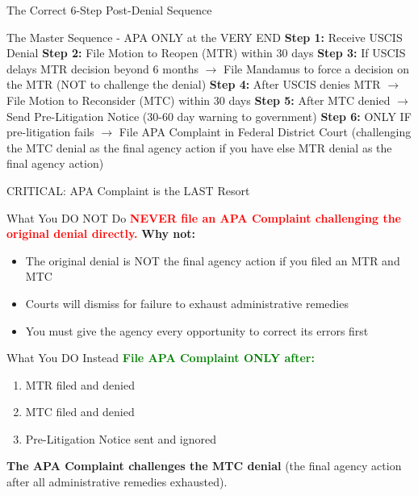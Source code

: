 \documentclass[11pt]{beamer}
\begin{document}
	
	\begin{frame}{The Correct 6-Step Post-Denial Sequence}
		\scriptsize
		\begin{block}{The Master Sequence - APA ONLY at the VERY END}
			\textbf{Step 1:} Receive USCIS Denial
			\vspace{0.1cm}
			\textbf{Step 2:} File Motion to Reopen (MTR) within 30 days
			\vspace{0.1cm}
			\textbf{Step 3:} If USCIS delays MTR decision beyond 6 months $\rightarrow$ File Mandamus to force a decision on the MTR (NOT to challenge the denial)
			\vspace{0.1cm}
			\textbf{Step 4:} After USCIS denies MTR $\rightarrow$ File Motion to Reconsider (MTC) within 30 days
			\vspace{0.1cm}
			\textbf{Step 5:} After MTC denied $\rightarrow$ Send Pre-Litigation Notice (30-60 day warning to government)
			\vspace{0.1cm}
			\textbf{Step 6:} ONLY IF pre-litigation fails $\rightarrow$ File APA Complaint in Federal District Court (challenging the MTC denial as the final agency action if you have else MTR denial as the final agency action)
		\end{block}
	\end{frame}
	
	\begin{frame}{CRITICAL: APA Complaint is the LAST Resort}
		\scriptsize
		\begin{block}{What You DO NOT Do}
			\textcolor{red}{\textbf{NEVER file an APA Complaint challenging the original denial directly.}}
			\vspace{0.2cm}
			\textbf{Why not:}
			\begin{itemize}
				\item The original denial is NOT the final agency action if you filed an MTR and MTC
				\item Courts will dismiss for failure to exhaust administrative remedies
				\item You must give the agency every opportunity to correct its errors first
			\end{itemize}
		\end{block}
		\begin{block}{What You DO Instead}
			\textcolor{green}{\textbf{File APA Complaint ONLY after:}}
			\begin{enumerate}
				\item MTR filed and denied
				\item MTC filed and denied
				\item Pre-Litigation Notice sent and ignored
			\end{enumerate}
			\textbf{The APA Complaint challenges the MTC denial} (the final agency action after all administrative remedies exhausted).
		\end{block}
	\end{frame}
	
\end{document}
